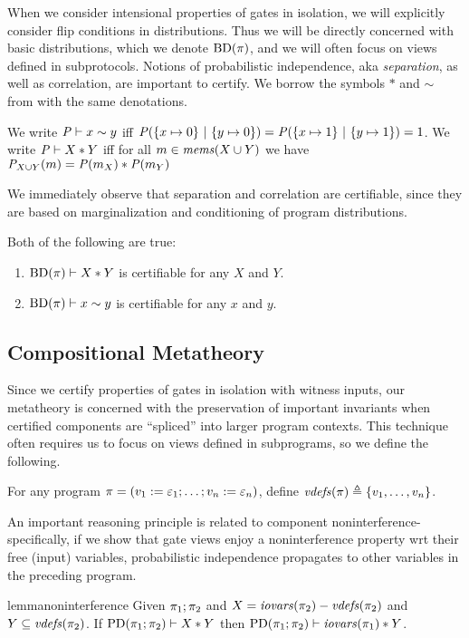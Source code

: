 When we consider intensional properties
of gates in isolation, we will explicitly consider flip conditions in
distributions. Thus we will be directly concerned with basic distributions,
which we denote $\mathrm{BD}(\pi)$, and we will often focus on views
defined in subprotocols. 
Notions of probabilistic independence, aka \emph{separation}, as well
as correlation, are important to certify. We borrow the symbols $*$
and $\sim$ from \cite{barthe2019probabilistic} with the same
denotations.
\begin{definition}
  We write $\mathit{P} \vdash x \sim y$ iff $\mathit{P}(\{ x \mapsto 0\}\ |\ \{ y \mapsto 0 \}) =
  \mathit{P}(\{ x \mapsto 1\}\ |\ \{ y \mapsto 1 \}) = 1$.
  We write $\mathit{P} \vdash X * Y$ iff for all
    $m \in \mathit{mems}(X \cup Y)$ we have
  ${\mathit{P}}_{X \cup Y}(m) =
  \mathit{P}(m_X) * \mathit{P}(m_Y)$
\end{definition}
We immediately observe that separation and correlation are certifiable,
since they are based on marginalization and conditioning of program
distributions. 
\begin{lemma}
  Both of the following are true:
  \begin{enumerate}
  \item $\mathrm{BD}(\pi) \vdash X * Y$ is certifiable for any $X$ and $Y$.
  \item $\mathrm{BD}(\pi) \vdash x \sim y$ is certifiable for any $x$ and $y$.
  \end{enumerate}
\end{lemma}

\subsection{Compositional Metatheory}

Since we certify properties of gates in isolation with witness inputs,
our metatheory is concerned with the preservation of important invariants
when certified components are ``spliced'' into larger program
contexts. This technique often requires us to focus on views defined
in subprograms, so we define the following.
\begin{definition}
For any program $\pi =
  (v_1 := \varepsilon_1;\ldots;v_n := \varepsilon_n)$, define
$\mathit{vdefs}(\pi) \triangleq \{ v_1,\ldots,v_n \}$.
\end{definition}

An important reasoning principle is related to component
noninterference- specifically, if we show that gate views enjoy a
noninterference property wrt their free (input) variables,
probabilistic independence propagates to other variables in the
preceding program.
\begin{restatable}[Noninterference]{lemma}{noninterference}
  \label{lemma-noninterference}
  Given $\pi_1;\pi_2$ and $X = \mathit{iovars}(\pi_2) - \mathit{vdefs}(\pi_2)$ and
  $Y \subseteq \mathit{vdefs}(\pi_2)$. If $\mathrm{PD}(\pi_1;\pi_2) \vdash X * Y$
  then $\mathrm{PD}(\pi_1;\pi_2) \vdash \mathit{iovars}(\pi_1) * Y$.
\end{restatable}

